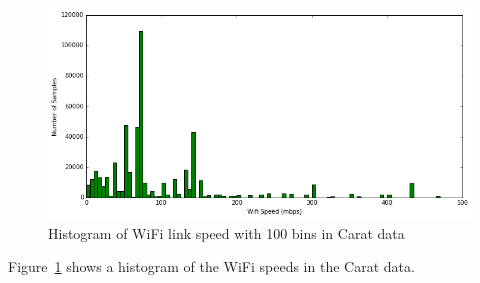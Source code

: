  \begin{figure} %
	\centering
	\includegraphics[width=\textwidth]{images/carat-data/wifi_speed.png}
	\caption{Histogram of WiFi link speed with 100 bins in Carat data}
	\label{figure:carat-data-wifi-speed}
\end{figure}

Figure~\ref{figure:carat-data-wifi-speed} shows a histogram of the WiFi speeds in the Carat data. 